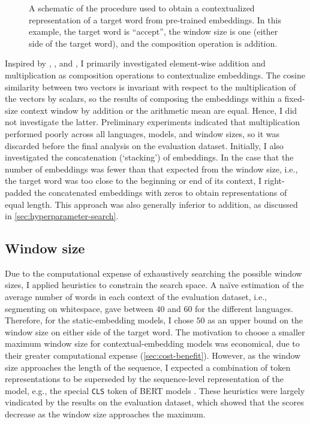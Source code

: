 \begin{figure}
  \centering
  
  \caption{A schematic of the procedure used to
    obtain a contextualized representation of a target word from pre-trained embeddings.
    In this example, the target word is ``accept'', the window size is one (either side of
    the target word), and the composition operation is addition.
  }
  \label{figure:schematic-procedure}
\end{figure}

Inspired by \textcites{Landauer1997}, \textcites{Kintsch2001}, and
\textcites{Mitchell2008}, I primarily investigated element-wise addition and
multiplication as composition operations to contextualize embeddings.
The cosine similarity between two vectors is invariant with respect to the
multiplication of the vectors by scalars, so the results of composing the embeddings
within a fixed-size context window by addition or the arithmetic mean are equal.
Hence, I did not investigate the latter.
Preliminary experiments indicated that multiplication performed poorly across all
languages, models, and window sizes, so it was discarded before the final analysis on
the evaluation dataset.
Initially, I also investigated the concatenation (`stacking') of embeddings.
In the case that the number of embeddings was fewer than that expected from the window
size, i.e., the target word was too close to the beginning or end of its context, I
right-padded the concatenated embeddings with zeros to obtain representations of equal
length.
This approach was also generally inferior to addition, as discussed in
\cref{sec:hyperparameter-search}.

\subsection{Window size}
\label{sec:window-size}

Due to the computational expense of exhaustively searching the possible window sizes, I
applied heuristics to constrain the search space.
A naïve estimation of the average number of words in each context of the evaluation
dataset, i.e., segmenting on whitespace, gave between $40$ and $60$ for the different
languages.
Therefore, for the static-embedding models, I chose $50$ as an upper bound on the
window size on either side of the target word.
The motivation to choose a smaller maximum window size for contextual-embedding models
was economical, due to their greater computational expense (\cref{sec:cost-benefit}).
However, as the window size approaches the length of the sequence, I expected a
combination of token representations to be superseded by the sequence-level
representation of the model, e.g., the special \texttt{CLS} token of BERT models
\parencites[4174]{Devlin2019}.
These heuristics were largely vindicated by the results on the evaluation dataset,
which showed that the scores decrease as the window size approaches the maximum.
